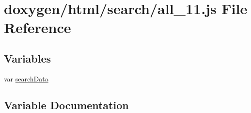 \hypertarget{a00043}{}\section{doxygen/html/search/all\+\_\+11.js File Reference}
\label{a00043}
\subsection*{Variables}
\begin{DoxyCompactItemize}
\item 
var \hyperlink{a00043_ad01a7523f103d6242ef9b0451861231e}{search\+Data}
\end{DoxyCompactItemize}


\subsection{Variable Documentation}
\hypertarget{a00043_ad01a7523f103d6242ef9b0451861231e}{}
